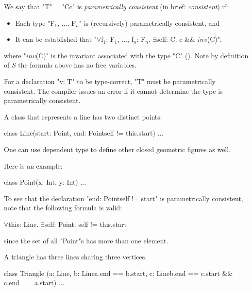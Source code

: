 We say that \xcd"T" = \xcd"C{c}" is {\em parametrically consistent} (in brief:
{\em consistent}) if:

\begin{itemize}
\item Each type \xcdmath"F$_1$, $\dots$, F$_n$" is (recursively) parametrically consistent, and
\item It can be established that
\xcdmath"$\forall$f$_1$: F$_1$, $\dots$, f$_n$: F$_n$. $\exists$self: C. c && $\mathit{inv}$(C)".
\end{itemize}

\noindent
where \xcdmath"$\mathit{inv}$(C)" is the invariant associated
with the type \xcd"C" ().  Note by
definition of $S$ the formula above has no free variables.

\begin{staticrule*}
For a declaration \xcd"v: T" to be type-correct, \xcd"T" must be parametrically
consistent. The compiler issues an error if it cannot determine
the type is parametrically consistent.
\end{staticrule*}

\begin{example}

A class that represents a line has two distinct points:

\begin{xten}
class Line(start: Point, 
           end: Point{self != this.start}) {...}      
\end{xten}
\end{example}

One can use dependent type to define other closed geometric figures as well.

\begin{example}
Here is an example:
\begin{xten}
class Point(x: Int, y: Int) {...}
\end{xten}
\end{example}


To see that the declaration \xcd"end: Point{self != start}" is
parametrically consistent, note that the following formula is valid:
\begin{xtenmath}
$\forall$this: Line. $\exists$self: Point. self != this.start  
\end{xtenmath}
\noindent since the set of all \xcd"Point"s has more than one element.

\begin{example}
A triangle has three lines sharing three vertices.
\begin{xten}
class Triangle 
 (a: Line, 
  b: Line{a.end == b.start}, 
  c: Line{b.end == c.start && c.end == a.start}) 
 { ... }
\end{xten}
\end{example}


